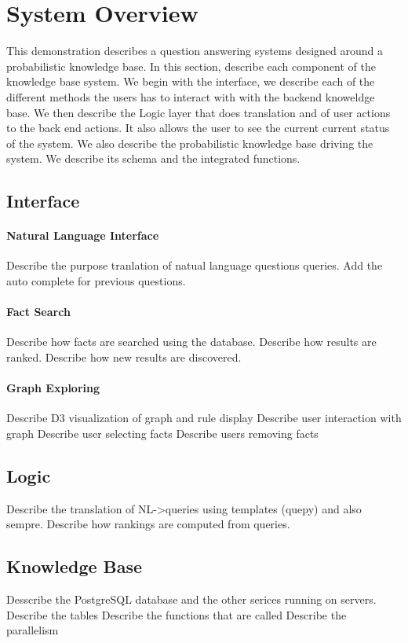 
\section{System Overview}

This demonstration describes a question answering systems designed around
a probabilistic knowledge base.
In this section, describe each component of the knowledge base system.
We begin with the interface, we describe each of the different methods
the users has to interact with with the backend knoweldge base.
We then describe the Logic layer that does translation and of user actions
to the back end actions. It also allows the user to see the current current
status of the system.
We also describe the probabilistic knowledge base driving the system.
We describe its schema and the integrated functions.



\subsection{Interface}

\paragraph{Natural Language Interface}
Describe the purpose tranlation of natual language questions queries.
Add the auto complete for previous questions.
\paragraph{Fact Search}
Describe how facts are searched using the database.
Describe how results are ranked.
Describe how new results are discovered.
\paragraph{Graph Exploring}
Describe D3 visualization of graph and rule display
Describe user interaction with graph
Describe user selecting facts
Describe users removing facts


\subsection{Logic}
Describe the translation of NL->queries using templates (quepy) and also sempre.
Describe how rankings are computed from queries.

\subsection{Knowledge Base}

Desscribe the PostgreSQL database and the other serices running on servers.
Describe the tables 
Describe the functions that are called
Describe the parallelism




